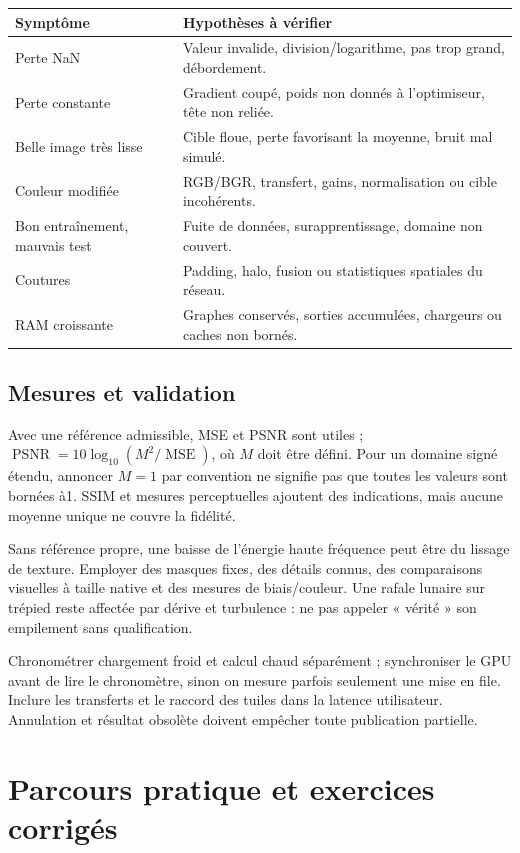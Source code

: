 \documentclass[12pt,a4paper,oneside]{report}
\begin{document}
\begin{longtable}{p{}p{}}
\toprule Symptôme & Hypothèses à vérifier \\ \midrule
Perte NaN & Valeur invalide, division/logarithme, pas trop grand, débordement.\\
Perte constante & Gradient coupé, poids non donnés à l'optimiseur, tête non reliée.\\
Belle image très lisse & Cible floue, perte favorisant la moyenne, bruit mal simulé.\\
Couleur modifiée & RGB/BGR, transfert, gains, normalisation ou cible incohérents.\\
Bon entraînement, mauvais test & Fuite de données, surapprentissage, domaine non couvert.\\
Coutures & Padding, halo, fusion ou statistiques spatiales du réseau.\\
RAM croissante & Graphes conservés, sorties accumulées, chargeurs ou caches non bornés.\\
\bottomrule
\end{longtable}

\section{Mesures et validation}

Avec une référence admissible, MSE et PSNR sont utiles ;
$\operatorname{PSNR}=10\log_{10}(M^2/\operatorname{MSE})$, où $M$ doit être
défini. Pour un domaine signé étendu, annoncer $M=1$ par convention ne signifie
pas que toutes les valeurs sont bornées à1. SSIM et mesures perceptuelles
ajoutent des indications, mais aucune moyenne unique ne couvre la fidélité.

Sans référence propre, une baisse de l'énergie haute fréquence peut être
du lissage de texture. Employer des masques fixes, des détails connus,
des comparaisons visuelles à taille native et des mesures de biais/couleur.
Une rafale lunaire sur trépied reste affectée par dérive et turbulence :
ne pas appeler « vérité » son empilement sans qualification.

Chronométrer chargement froid et calcul chaud séparément ; synchroniser le GPU
avant de lire le chronomètre, sinon on mesure parfois seulement une mise en file.
Inclure les transferts et le raccord des tuiles dans la latence utilisateur.
Annulation et résultat obsolète doivent empêcher toute publication partielle.

\chapter{Parcours pratique et exercices corrigés}
\end{document}
